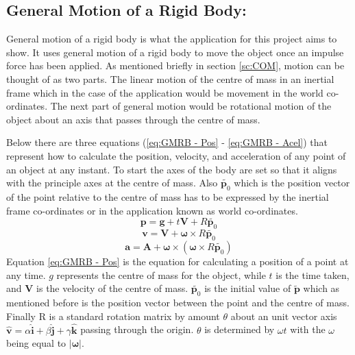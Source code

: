 \subsection{General Motion of a Rigid Body:}\label{sc:GMORB}
General motion of a rigid body is what the application for this project aims to show.
It uses general motion of a rigid body to move the object once an impulse force has been applied.
As mentioned briefly in section \ref{sc:COM}, motion can be thought of as two parts.
The linear motion of the centre of mass in an inertial frame which in the case of the application would be movement in the world co-ordinates.
The next part of general motion would be rotational motion of the object about an axis that passes through the centre of mass. 

Below there are three equations (\ref{eq:GMRB - Pos} - \ref{eq:GMRB - Acel}) that represent how to calculate the position, velocity, and acceleration of any point of an object at any instant.
To start the axes of the body are set so that it aligns with the principle axes at the centre of mass.
Also $\tilde{\mathbf{p}_{0}}$ which is the position vector of the point relative  to the centre of mass has to be expressed by the inertial frame co-ordinates or in the application known as world co-ordinates.
\begin{equation}\label{eq:GMRB - Pos}
\mathbf{p}=\mathbf{g}+t\mathbf{V}+{R}\tilde{\mathbf{p}_{0}}
\end{equation}
\begin{equation}\label{eq:GMRB - Velo}
\mathbf{v}=\mathbf{V}+\boldsymbol\omega\times{R}\tilde{\mathbf{p}_{0}}
\end{equation}
\begin{equation}\label{eq:GMRB - Acel}
\mathbf{a}=\mathbf{A}+\boldsymbol\omega\times(\boldsymbol\omega\times{R}\tilde{\mathbf{p}_{0}})
\end{equation}
Equation \ref{eq:GMRB - Pos} is the equation for calculating a position of a point at any time. $g$ represents the centre of mass for the object, while $t$ is the time taken, and $\mathbf{V}$ is the velocity of the centre of mass. $\tilde{\mathbf{p}_{0}}$ is the initial value of $\tilde{\mathbf{p}}$ which as mentioned before is the position vector between the point and the centre of mass.
Finally R is a standard rotation matrix by amount $\theta$ about an unit vector axis $\hat{\mathbf{v}} = \alpha\hat{\mathbf{i}} + \beta\hat{\mathbf{j}} + \gamma\hat{\mathbf{k}}$ passing through the origin.
$\theta$ is determined by $\omega t$ with the $\omega$ being equal to $|\boldsymbol{\omega}|$.
